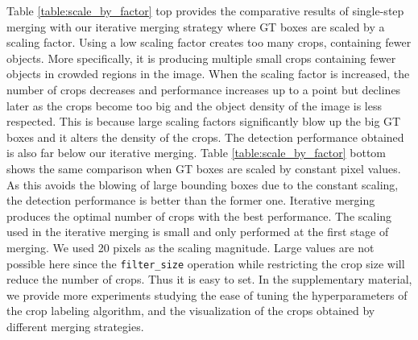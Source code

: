 Table \ref{table:scale_by_factor} top provides the comparative results of single-step merging with our iterative merging strategy where GT boxes are scaled by a scaling factor. Using a low scaling factor creates too many crops, containing fewer objects. More specifically, it is producing multiple small crops containing fewer objects in crowded regions in the image. When the scaling factor is increased, the number of crops decreases and performance increases up to a point but declines later as the crops become too big and the object density of the image is less respected. This is because large scaling factors significantly blow up the big GT boxes and it alters the density of the crops. The detection performance obtained is also far below our iterative merging. Table \ref{table:scale_by_factor} bottom shows the same comparison when GT boxes are scaled by constant pixel values. As this avoids the blowing of large bounding boxes due to the constant scaling, the detection performance is better than the former one. Iterative merging produces the optimal number of crops with the best performance. The scaling used in the iterative merging is small and only performed at the first stage of merging. We used 20 pixels as the scaling magnitude. Large values are not possible here since the \texttt{filter\_size} operation while restricting the crop size will reduce the number of crops. Thus it is easy to set. In the supplementary material, we provide more experiments studying the ease of tuning the hyperparameters  of the crop labeling algorithm, and the visualization of the crops obtained by different merging strategies.


